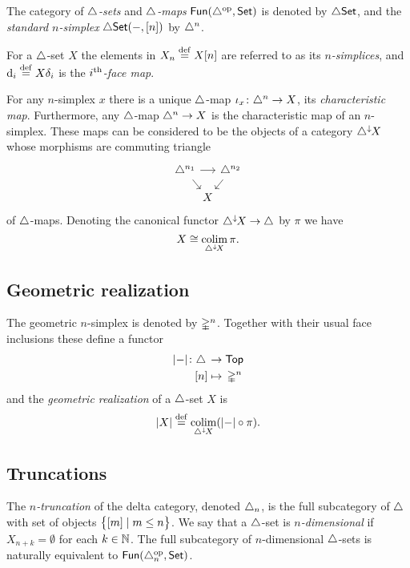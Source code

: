 The category of \textit{$\simplex$-sets} and \textit{$\simplex$-maps} $\Fun(\simplex^\op, \Set)$ is denoted by $\dSet$, and the \textit{standard $n$-simplex} $\dSet(-, [n])$ by $\simplex^n$.

For a $\simplex$-set $X$ the elements in $X_n \defeq X[n]$ are referred to as its \textit{$n$-simplices}, and $\face_i \defeq X \delta_i$ is the \textit{$i^\th$-face map}.

For any $n$-simplex $x$ there is a unique $\simplex$-map $\iota_x \colon \simplex^n \to X$, its \textit{characteristic map}.
Furthermore, any $\simplex$-map $\simplex^n \to X$ is the characteristic map of an $n$-simplex.
These maps can be considered to be the objects of a category $\deltaover{X}$ whose morphisms are commuting triangle
\[
\begin{tikzcd}[column sep=-2pt, row sep=small]
	\simplex^{n_1} \arrow[dr] \arrow[rr] & & \simplex^{n_2}  \arrow[dl] \\
	& X &
\end{tikzcd}
\]
of $\simplex$-maps.
Denoting the canonical functor $\deltaover{X} \to \simplex$ by $\pi$ we have
\[
X \cong \colim_{\deltaover{X}} \pi.
\]

\subsection{Geometric realization}

The geometric $n$-simplex is denoted by $\gsimplex^n$.
Together with their usual face inclusions these define a functor
\[
\begin{split}
	\bars{-} \colon \simplex \, &\to \Top \\
	[n] &\mapsto \, \gsimplex^n
\end{split}
\]
and the \textit{geometric realization} of a $\simplex$-set $X$ is
\[
\bars{X} \defeq \colim_{\deltaover{X}}(\bars{-} \circ \pi).
\]

\subsection{Truncations}

The \textit{$n$-truncation} of the delta category, denoted $\simplex_n$, is the full subcategory of $\simplex$ with set of objects $\set[\big]{[m] \mid m \leq n}$.
We say that a $\simplex$-set is \textit{$n$-dimensional} if $X_{n+k} = \emptyset$ for each $k \in \N$.
The full subcategory of $n$-dimensional $\simplex$-sets is naturally equivalent to $\Fun(\simplex^\op_n, \Set)$.

